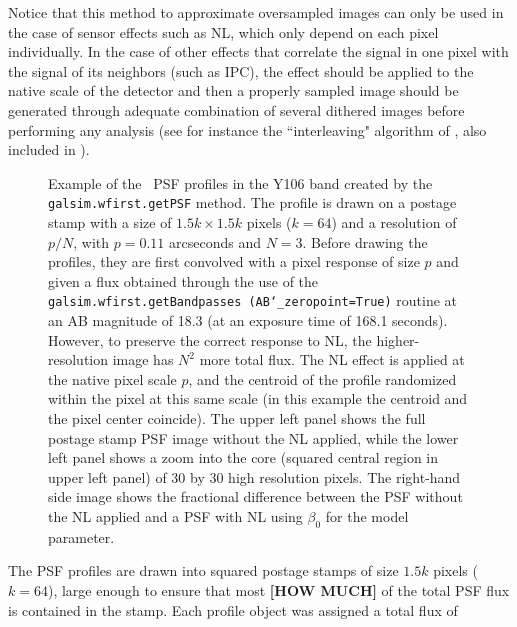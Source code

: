 \documentclass[11pt,preprint,flushrt]{aastex}
\begin{document}

Notice that this method to approximate oversampled images can only be used in the case of sensor effects such as NL, which only depend on each pixel individually. In the case of other effects that correlate the signal in one pixel with the signal of its neighbors (such as IPC), the effect should be applied to the native scale of the detector and then a properly sampled image should be generated through adequate combination of several dithered images before performing any analysis (see for instance the ``interleaving" algorithm of \citealt{kannawadi15}, also included in \gs). 

\begin{figure}[!ht]
\centering
{}
\caption{Example of the \wfa\ PSF profiles in the Y106 band created by the {\tt{galsim.wfirst.getPSF}} method. The profile is drawn on a postage stamp with a size of $1.5k \times1.5k$ pixels ($k=64$) and a resolution of $p/N$, with $p=0.11$ arcseconds and $N=3$. Before drawing the profiles, they are first convolved with a pixel response of size $p$ and given a flux obtained through the use of the {\tt{galsim.wfirst.getBandpasses (AB\char`_zeropoint=True)}} routine at an AB magnitude of 18.3 (at an exposure time of 168.1 seconds). However, to preserve the correct response to NL, the higher-resolution image has $N^2$ more total flux. The NL effect is applied at the native pixel scale $p$, and the centroid of the profile randomized within the pixel at this same scale (in this example the centroid and the pixel center coincide). The upper left panel shows the full postage stamp PSF image without the NL applied, while the lower left panel shows a zoom into the core (squared central region in upper left panel) of 30 by 30 high resolution pixels. The right-hand side image shows the fractional difference between the PSF without the NL applied and a PSF with NL using $\beta_0$ for the model parameter.} 
\label{f1}
\end{figure}

The PSF profiles are drawn into squared postage stamps of size $1.5k$ pixels ($k=64$), large enough to ensure that most \textbf{[HOW MUCH]} of the total PSF flux is contained in the stamp. %
Each profile object was assigned a total flux of 
\end{document}
